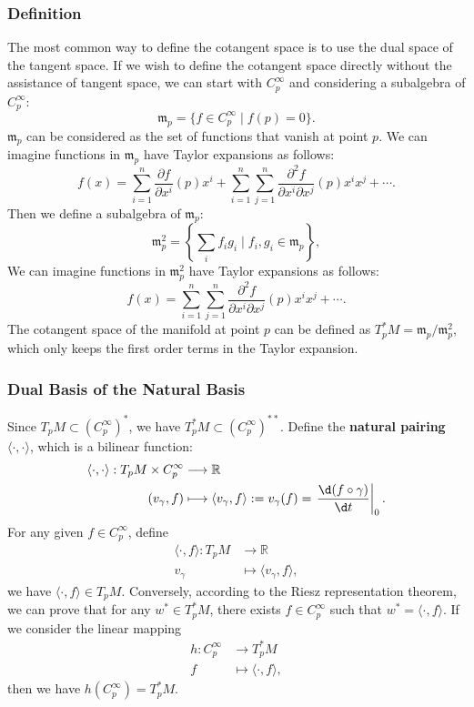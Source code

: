 \documentclass{report}
\begin{document}
\subsubsection{Definition}
The most common way to define the cotangent space is to use the dual space of the tangent space.
If we wish to define the cotangent space directly without the assistance of tangent space, we can start with $C^\infty_p$ and considering a subalgebra of $C^\infty_p$:
\[
    \mathfrak{m}_p=\{f\in C^\infty_p\mid f(p)=0\}.
\]
$\mathfrak{m}_p$ can be considered as the set of functions that vanish at point $p$. We can imagine functions in $\mathfrak{m}_p$ have Taylor expansions as follows:
\[
    f(x)=\sum_{i=1}^n\frac{\partial f}{\partial x^i}(p)x^i+\sum_{i=1}^n\sum_{j=1}^n\frac{\partial^2 f}{\partial x^i\partial x^j}(p)x^ix^j+\cdots.
\] 
Then we define a subalgebra of $\mathfrak{m}_p$:
\[
    \mathfrak{m}^2_p=\left\{\sum_if_ig_i\mid f_i, g_i\in \mathfrak{m}_p\right\},
\]
We can imagine functions in $\mathfrak{m}_p^2$ have Taylor expansions as follows:
\[
    f(x)=\sum_{i=1}^n\sum_{j=1}^n\frac{\partial^2 f}{\partial x^i\partial x^j}(p)x^ix^j+\cdots.
\] 
The cotangent space of the manifold at point $p$ can be defined as $T_p^*M=\mathfrak{m}_p/\mathfrak{m}^2_p$, which only keeps the first order terms in the Taylor expansion.

\subsubsection{Dual Basis of the Natural Basis}
Since $T_pM\subset \left(C^\infty_p\right)^*$, we have $T_p^*M\subset \left(C^\infty_p\right)^{**}$. Define the \textbf{natural pairing} $\langle\cdot,\cdot\rangle$, which is a bilinear function:
\[
    \begin{aligned}
    \langle\cdot,\cdot\rangle:T_pM\times C^\infty_p&\longrightarrow\mathbb{R}\\
    (v_\gamma,f)&\longmapsto\langle v_\gamma,f\rangle:=v_\gamma(f)=\left.\frac{\d(f\circ \gamma)}{\d t}\right|_{0}.
    \end{aligned}
\]
For any given $f\in C^\infty_p$, define
\[
    \begin{aligned}
        \langle\cdot,f\rangle:T_pM&\longrightarrow\mathbb{R}\\
        v_\gamma&\longmapsto\langle v_\gamma,f\rangle,
    \end{aligned}
\]
we have $\langle\cdot,f\rangle\in T_pM$. Conversely, according to the Riesz representation theorem, we can prove that for any $w^*\in T_p^*M$, there exists $f\in C^\infty_p$ such that $w^*=\langle\cdot,f\rangle$. If we consider the linear mapping
\[
    \begin{aligned}
        h:C^\infty_p&\longrightarrow T_p^*M\\
        f&\longmapsto\langle\cdot,f\rangle,
    \end{aligned}
\]
then we have $h(C^\infty_p)=T_p^*M$.
\end{document}
